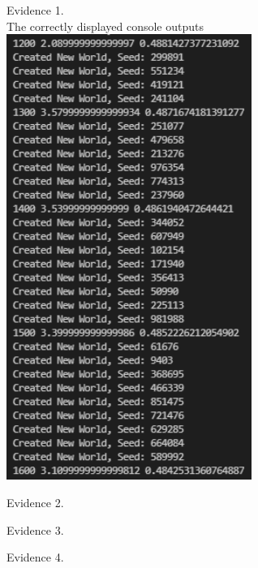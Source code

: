 \begin{flushleft}
\begin{center}
        {\large Evidence 1.\rn } \\ 
        \vspace{0.3cm}
        The correctly displayed console outputs \\
        \includegraphics[width=8cm]{Images/Testing/T1.10.1.PNG} \\
    \end{center}

    \setcounter{magicrownumbers}{0}
    \begin{center}
        {\large Evidence 2.\rn } \\ 
        \vspace{0.3cm}
    \end{center}

    \setcounter{magicrownumbers}{0}
    \begin{center}
        {\large Evidence 3.\rn } \\ 
        \vspace{0.3cm}
    \end{center}

    \setcounter{magicrownumbers}{0}
    \begin{center}
        {\large Evidence 4.\rn } \\ 
        \vspace{0.3cm}


\end{center}
\end{flushleft}
